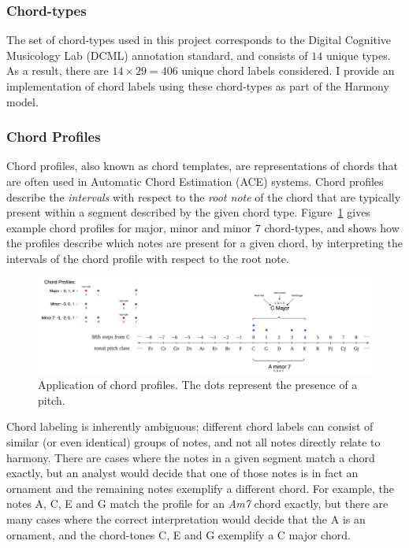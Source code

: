 \documentclass[12pt,a4paper,twoside,openany]{report} \usepackage[pdfborder={0 0 0}]{hyperref}    %
\theoremstyle{definition} \newtheorem{definition}{Definition}[section]
\begin{document}
\subsubsection{Chord-types}
\label{sub:chordTypes}
The set of chord-types used in this project corresponds to the Digital Cognitive Musicology Lab (DCML)
annotation standard, and consists of $14$ unique types. As a result, there are $14 \times 29 = 406$ unique chord labels
considered. I provide an implementation of chord labels using these
chord-types as part of the Harmony model.

\subsubsection{Chord Profiles}
\label{sub:chordProfiles}

Chord profiles, also known as chord templates, are representations of chords that are often used in Automatic Chord
Estimation (ACE) systems. Chord profiles describe the \textit{intervals} with respect to the \textit{root note} of the chord that
are typically present within a segment described by the given chord type. Figure~\ref{fig:chordProfiles} gives
example chord profiles for major, minor and minor 7 chord-types, and shows how the profiles describe which notes are present for
a given chord, by interpreting the intervals of the chord profile with respect to the root note. 

\begin{figure}[h]
  \begin{center}
    \includegraphics[width=\textwidth]{figs/prep/inferringHarmony/chordProfiles.png}
  \end{center}
  \caption{Application of chord profiles. The dots represent the presence of a pitch.}
  \label{fig:chordProfiles}
\end{figure}

Chord labeling is inherently ambiguous; different chord labels can consist of similar (or even identical)
groups of notes, and not all notes directly relate to harmony. There are cases where the notes in a given segment
match a chord exactly, but an analyst would decide that one of those notes is in fact an ornament and the remaining
notes exemplify a different chord. For example, the notes A, C, E and G match the profile for an \textit{Am7} chord exactly, but there
are many cases where the correct interpretation would decide that the A is an ornament, and the chord-tones C, E and
G exemplify a C major chord. 
\end{document}
